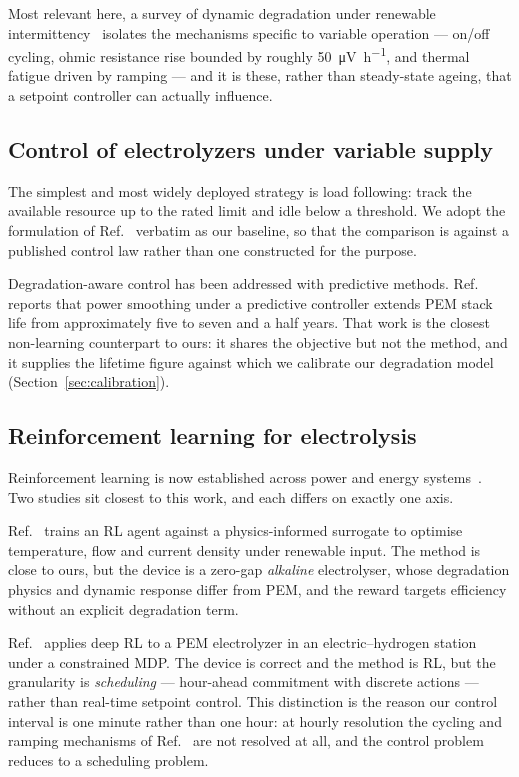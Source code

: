 \documentclass[conference]{IEEEtran}
\begin{document}
Most relevant here, a survey of dynamic degradation under renewable
intermittency~\cite{intermittency2025} isolates the mechanisms specific to variable
operation --- on/off cycling, ohmic resistance rise bounded by roughly
\SI{50}{\micro\volt\per\hour}, and thermal fatigue driven by ramping --- and it is these,
rather than steady-state ageing, that a setpoint controller can actually influence.

\subsection{Control of electrolyzers under variable supply}
The simplest and most widely deployed strategy is load following: track the available
resource up to the rated limit and idle below a threshold. We adopt the formulation of
Ref.~\cite{pvt_control_2026} verbatim as our baseline, so that the comparison is against a
published control law rather than one constructed for the purpose.

Degradation-aware control has been addressed with predictive methods.
Ref.~\cite{mpc_refuel_2026} reports that power smoothing under a predictive controller
extends PEM stack life from approximately five to seven and a half years. That work is the
closest non-learning counterpart to ours: it shares the objective but not the method, and
it supplies the lifetime figure against which we calibrate our degradation model
(Section~\ref{sec:calibration}).

\subsection{Reinforcement learning for electrolysis}
Reinforcement learning is now established across power and energy
systems~\cite{cao2020rlreview}. Two studies sit closest to this work, and each differs on
exactly one axis.

Ref.~\cite{awe_rl_2025} trains an RL agent against a physics-informed surrogate to
optimise temperature, flow and current density under renewable input. The method is close
to ours, but the device is a zero-gap \emph{alkaline} electrolyser, whose degradation
physics and dynamic response differ from PEM, and the reward targets efficiency without an
explicit degradation term.

Ref.~\cite{drl_scheduling_2026} applies deep RL to a PEM electrolyzer in an
electric--hydrogen station under a constrained MDP. The device is correct and the method is
RL, but the granularity is \emph{scheduling} --- hour-ahead commitment with discrete
actions --- rather than real-time setpoint control. This distinction is the reason our
control interval is one minute rather than one hour: at hourly resolution the cycling and
ramping mechanisms of Ref.~\cite{intermittency2025} are not resolved at all, and the
control problem reduces to a scheduling problem.
\end{document}
